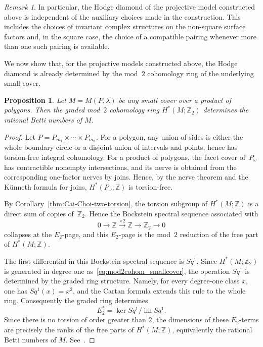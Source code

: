 \documentclass{amsart}
\newtheorem{proposition}[theorem]{Proposition}
\numberwithin{equation}{section}
\theoremstyle{definition}
\theoremstyle{remark}
\newtheorem{remark}[theorem]{Remark}
\newcommand{\Z}{\mathbb Z}
\DeclareMathOperator{\im}{im}
\begin{document}
\begin{remark}\label{rem:hodge-independent-choices}
    In particular, the Hodge diamond of the projective model constructed above is independent of the auxiliary choices made in the construction.
    This includes the choices of invariant complex structures on the non-square surface factors and, in the square case, the choice of a compatible pairing whenever more than one such pairing is available.
\end{remark}

We now show that, for the projective models constructed above, the Hodge diamond is already determined by the mod~$2$ cohomology ring of the underlying small cover.

\begin{proposition}\label{prop:mod2-determines-rational-betti-products-polygons}
    Let $M=M(P,\lambda)$ be any small cover over a product of polygons.
    Then the graded mod~$2$ cohomology ring $H^\ast(M;\Z_2)$ determines the rational Betti numbers of $M$.
\end{proposition}

\begin{proof}
    Let $P=P_{m_1}\times\cdots\times P_{m_n}$.
    For a polygon, any union of sides is either the whole boundary circle or a disjoint union of intervals and points, hence has torsion-free integral cohomology. 
    For a product of polygons, the facet cover of~$P_\omega$ has contractible nonempty intersections, and its nerve is obtained from the corresponding one-factor nerves by joins. 
    Hence, by the nerve theorem and the Künneth formula for joins, $H^\ast(P_\omega; \Z)$ is torsion-free.
    
    By Corollary~\ref{thm:Cai-Choi-two-torsion}, the torsion subgroup of $H^\ast(M;\Z)$ is a direct sum of copies of~$\Z_2$.
    Hence the Bockstein spectral sequence associated with
    $$
        0\to \Z \xrightarrow{\times 2}\Z\to \Z_2\to 0
    $$
    collapses at the $E_2$-page, and this $E_2$-page is the mod~$2$ reduction of the free part of $H^\ast(M;\Z)$.
    
    The first differential in this Bockstein spectral sequence is $Sq^1$.
    Since $H^\ast(M;\Z_2)$ is generated in degree one as~\eqref{eq:mod2cohom_smallcover}, the operation $Sq^1$ is determined by the graded ring structure.
    Namely, for every degree-one class $x$, one has $Sq^1(x)=x^2$, and the Cartan formula extends this rule to the whole ring.
    Consequently the graded ring determines
    $$
        E_2^\ast=\ker Sq^1/\im Sq^1.
    $$
    Since there is no torsion of order greater than $2$, the dimensions of these $E_2$-terms are precisely the ranks of the free parts of $H^\ast(M;\Z)$, equivalently the rational Betti numbers of $M$.
    See~\cite[Lemma~8.1]{Choi-Masuda-Suh2010TAMS}.
\end{proof}
\end{document}
